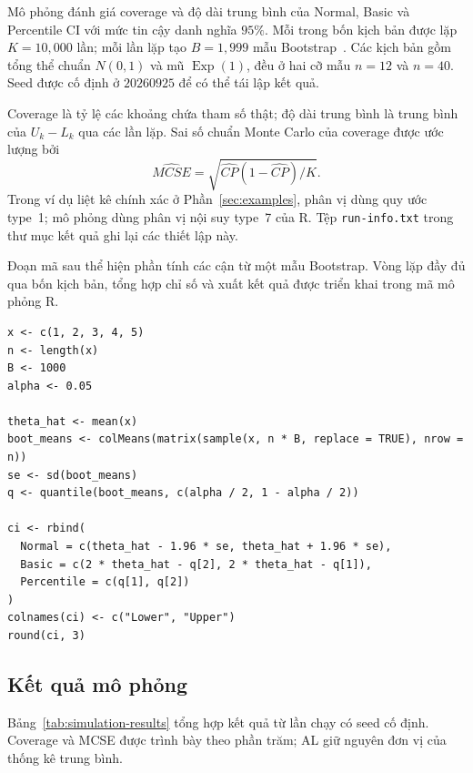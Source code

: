 \documentclass[12pt,a4paper]{article}
\theoremstyle{definition}
\numberwithin{equation}{section}
\begin{document}
Mô phỏng đánh giá coverage và độ dài trung bình của Normal, Basic và
Percentile CI với mức tin cậy danh nghĩa $95\%$. Mỗi trong bốn kịch bản
được lặp $K=10{,}000$ lần; mỗi lần lặp tạo $B=1{,}999$ mẫu Bootstrap~\cite{buithuytrang2026,davison1997,justus2024}.
Các kịch bản gồm tổng thể chuẩn $N(0,1)$ và mũ $\operatorname{Exp}(1)$,
đều ở hai cỡ mẫu $n=12$ và $n=40$. Seed được cố định ở $20260925$ để có
thể tái lập kết quả.

Coverage là tỷ lệ các khoảng chứa tham số thật; độ dài trung bình là trung
bình của $U_k-L_k$ qua các lần lặp. Sai số chuẩn Monte Carlo của coverage
được ước lượng bởi
\[
\widehat{MCSE}=\sqrt{\widehat{CP}(1-\widehat{CP})/K}.
\]
Trong ví dụ liệt kê chính xác ở Phần~\ref{sec:examples}, phân vị dùng
quy ước type~1; mô phỏng dùng phân vị nội suy type~7 của R. Tệp
\texttt{run-info.txt} trong thư mục kết quả ghi lại các thiết lập này.

Đoạn mã sau thể hiện phần tính các cận từ một mẫu Bootstrap. Vòng lặp đầy
đủ qua bốn kịch bản, tổng hợp chỉ số và xuất kết quả được triển khai trong
mã mô phỏng R.

\begin{lstlisting}[style=Rstyle, caption={Tính các khoảng tin cậy}]
x <- c(1, 2, 3, 4, 5)
n <- length(x)
B <- 1000
alpha <- 0.05

theta_hat <- mean(x)
boot_means <- colMeans(matrix(sample(x, n * B, replace = TRUE), nrow = n))
se <- sd(boot_means)
q <- quantile(boot_means, c(alpha / 2, 1 - alpha / 2))

ci <- rbind(
  Normal = c(theta_hat - 1.96 * se, theta_hat + 1.96 * se),
  Basic = c(2 * theta_hat - q[2], 2 * theta_hat - q[1]),
  Percentile = c(q[1], q[2])
)
colnames(ci) <- c("Lower", "Upper")
round(ci, 3)
\end{lstlisting}

\subsection{Kết quả mô phỏng}

Bảng~\ref{tab:simulation-results} tổng hợp kết quả từ lần chạy có seed cố
định. Coverage và MCSE được trình bày theo phần trăm; AL giữ nguyên đơn vị
của thống kê trung bình.
\end{document}
